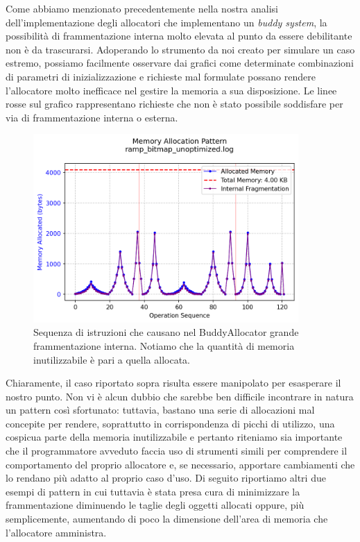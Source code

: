 Come abbiamo menzionato precedentemente nella nostra analisi dell'implementazione degli allocatori che implementano un \textit{buddy system}, la possibilità di frammentazione interna molto elevata al punto da essere debilitante non è da trascurarsi. Adoperando lo strumento da noi creato per simulare un caso estremo, possiamo facilmente osservare dai grafici come determinate combinazioni di parametri di inizializzazione e richieste mal formulate possano rendere l'allocatore molto inefficace nel gestire la memoria a sua disposizione. Le linee rosse sul grafico rappresentano richieste che non è stato possibile soddisfare per via di frammentazione interna o esterna.
\begin{figure}[H]
  \centering
  \includegraphics[width=0.9\textwidth]{graphs/ramp_bitmap_unoptimized.png}
  \caption{Sequenza di istruzioni che causano nel BuddyAllocator grande frammentazione interna. Notiamo che la quantità di memoria inutilizzabile è pari a quella allocata.}
  \label{fig:ramp_bitmap_unoptimized}
\end{figure}

Chiaramente, il caso riportato sopra risulta essere manipolato per esasperare il nostro punto. Non vi è alcun dubbio che sarebbe ben difficile incontrare in natura un pattern così sfortunato: tuttavia, bastano una serie di allocazioni mal concepite per rendere, soprattutto in corrispondenza di picchi di utilizzo, una cospicua parte della memoria inutilizzabile e pertanto riteniamo sia importante che il programmatore avveduto faccia uso di strumenti simili per comprendere il comportamento del proprio allocatore e, se necessario, apportare cambiamenti che lo rendano più adatto al proprio caso d'uso. Di seguito riportiamo altri due esempi di pattern in cui tuttavia è stata presa cura di minimizzare la frammentazione diminuendo le taglie degli oggetti allocati oppure, più semplicemente, aumentando di poco la dimensione dell'area di memoria che l'allocatore amministra.


